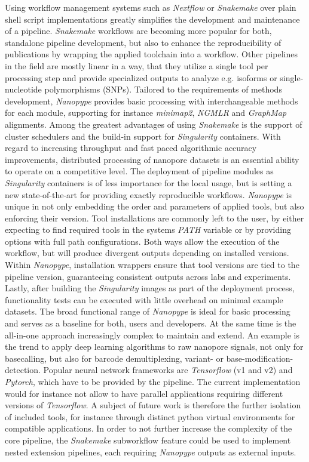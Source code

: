Using workflow management systems such as \textit{Nextflow} or \textit{Snakemake} over plain shell script implementations greatly simplifies the development and maintenance of a pipeline.
\textit{Snakemake} workflows are becoming more popular for both, standalone pipeline development, but also to enhance the reproducibility of publications by wrapping the applied toolchain into a workflow.
Other pipelines in the field are mostly linear in a way, that they utilize a single tool per processing step and provide specialized outputs to analyze e.g. isoforms or single-nucleotide polymorphisms (SNPs).
Tailored to the requirements of methods development, \textit{Nanopype} provides basic processing with interchangeable methods for each module, supporting for instance \textit{minimap2}, \textit{NGMLR} and \textit{GraphMap} alignments.
Among the greatest advantages of using \textit{Snakemake} is the support of cluster schedulers and the build-in support for \textit{Singularity} containers.
With regard to increasing throughput and fast paced algorithmic accuracy improvements, distributed processing of nanopore datasets is an essential ability to operate on a competitive level.
The deployment of pipeline modules as \textit{Singularity} containers is of less importance for the local usage, but is setting a new state-of-the-art for providing exactly reproducible workflows.
\textit{Nanopype} is unique in not only embedding the order and parameters of applied tools, but also enforcing their version.
Tool installations are commonly left to the user, by either expecting to find required tools in the systems \textit{PATH} variable or by providing options with full path configurations.
Both ways allow the execution of the workflow, but will produce divergent outputs depending on installed versions.
Within \textit{Nanopype}, installation wrappers ensure that tool versions are tied to the pipeline version, guaranteeing consistent outputs across labs and experiments.
Lastly, after building the \textit{Singularity} images as part of the deployment process, functionality tests can be executed with little overhead on minimal example datasets.
The broad functional range of \textit{Nanopype} is ideal for basic processing and serves as a baseline for both, users and developers.
At the same time is the all-in-one approach increasingly complex to maintain and extend.
An example is the trend to apply deep learning algorithms to raw nanopore signals, not only for basecalling, but also for barcode demultiplexing, variant- or base-modification-detection.
Popular neural network frameworks are \textit{Tensorflow} (v1 and v2) and \textit{Pytorch}, which have to be provided by the pipeline.
The current implementation would for instance not allow to have parallel applications requiring different versions of \textit{Tensorflow}.
A subject of future work is therefore the further isolation of included tools, for instance through distinct python virtual environments for compatible applications.
In order to not further increase the complexity of the core pipeline, the \textit{Snakemake} subworkflow feature could be used to implement nested extension pipelines, each requiring \textit{Nanopype} outputs as external inputs.


